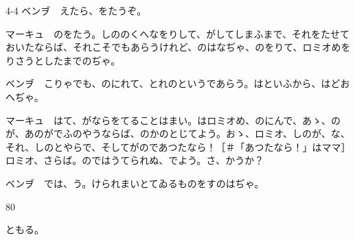 \documentclass[tate,paper=b6j,jafontsize=9pt]{jlreq}
\begin{document}
\begin{azconvIndented}{4\zw}{-4\zw}
ベンヺ　えたら、をたうぞ。

マーキュ　のをたう。しののくへなをりして、がしてしまふまで、それをたせておいたならば、それこそでもあらうけれど、のはなぢゃ、のをりて、ロミオめをりさうとしたまでのぢゃ。

ベンヺ　こりゃでも、のにれて、とれのというであらう。はといふから、はどおへぢゃ。

マーキュ　はて、がならをてることはまい。はロミオめ、のにんで、あゝ、のが、あのがでふのやうならば、のかのとじてよう。おゝ、ロミオ、しのが、な、それ、しのとやらで、そしてがのであつたなら！{\small ［＃「あつたなら！」はママ］}　ロミオ、さらば。のではうてられぬ、でよう。さ、かうか？

ベンヺ　では、う。けられまいとてゐるものをすのはぢゃ。

\end{azconvIndented}
\begin{azconvIndented}{8\zw}{0\zw}

ともる。

\end{azconvIndented}
\end{document}
